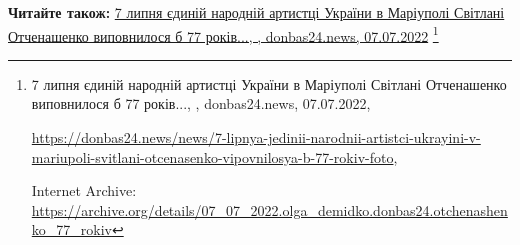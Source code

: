  
 
 
 
 

\def\pubIA{https://archive.org/details/07_07_2022.olga_demidko.donbas24.otchenashenko_77_rokiv}
\def\pubTitle{7 липня єдиній народній артистці України в Маріуполі Світлані Отченашенко виповнилося б 77 років...}
\def\pubDate{07.07.2022}
\def\pubOrigin{https://donbas24.news/news/7-lipnya-jedinii-narodnii-artistci-ukrayini-v-mariupoli-svitlani-otcenasenko-vipovnilosya-b-77-rokiv-foto}
\def\pubAuthor{\pubAuthorDemidko}

\textbf{Читайте також:} \href{\pubIA}{%
\pubTitle, \pubAuthor, donbas24.news, \pubDate}%
\footnote{\pubTitle, \pubAuthor, donbas24.news, \pubDate, \par\url{\pubOrigin}, \par Internet Archive: \url{\pubIA}}

